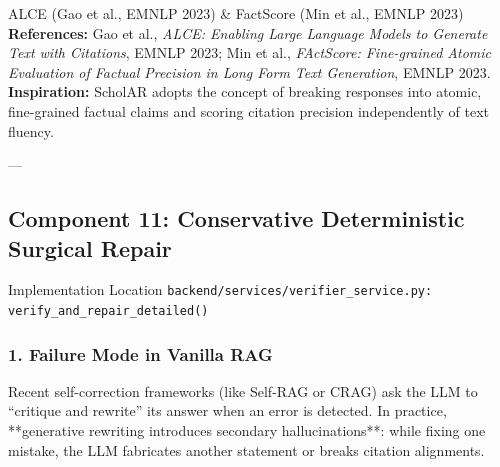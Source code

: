 \documentclass[11pt,a4paper]{article}
\begin{document}
\begin{inspirationbox}{ALCE (Gao et al., EMNLP 2023) \& FactScore (Min et al., EMNLP 2023)}
\textbf{References:} Gao et al., \emph{ALCE: Enabling Large Language Models to Generate Text with Citations}, EMNLP 2023; Min et al., \emph{FActScore: Fine-grained Atomic Evaluation of Factual Precision in Long Form Text Generation}, EMNLP 2023.\\
\textbf{Inspiration:} ScholAR adopts the concept of breaking responses into atomic, fine-grained factual claims and scoring citation precision independently of text fluency.
\end{inspirationbox}

---

\subsection{Component 11: Conservative Deterministic Surgical Repair}
\begin{codebox}{Implementation Location}
\texttt{backend/services/verifier\_service.py: verify\_and\_repair\_detailed()}
\end{codebox}

\subsubsection{1. Failure Mode in Vanilla RAG}
Recent self-correction frameworks (like Self-RAG or CRAG) ask the LLM to ``critique and rewrite'' its answer when an error is detected. In practice, **generative rewriting introduces secondary hallucinations**: while fixing one mistake, the LLM fabricates another statement or breaks citation alignments.
\end{document}
